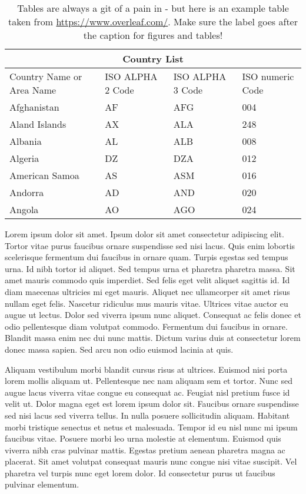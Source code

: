 \begin{table}
	\begin{center}
\begin{tabular}{ |p{3cm}||p{3cm}|p{3cm}|p{3cm}|  }
	\hline
	\multicolumn{4}{|c|}{Country List} \\
	\hline
	Country Name     or Area Name& ISO ALPHA 2 Code &ISO ALPHA 3 Code&ISO numeric Code\\
	\hline
	Afghanistan   & AF    &AFG&   004\\
	Aland Islands&   AX  & ALA   &248\\
	Albania &AL & ALB&  008\\
	Algeria    &DZ & DZA&  012\\
	American Samoa&   AS  & ASM&016\\
	Andorra& AD  & AND   &020\\
	Angola& AO  & AGO&024\\
	\hline
\end{tabular}
\caption{Tables are always a git of a pain in \LaTeXe - but here is an example table taken from \url{https://www.overleaf.com/}. Make sure the label goes after the caption for figures and tables!}
\label{tab:table_ex}
\end{center}	
\end{table}

Lorem ipsum dolor sit amet. Ipsum dolor sit amet consectetur adipiscing elit. Tortor vitae purus faucibus ornare suspendisse sed nisi lacus. Quis enim lobortis scelerisque fermentum dui faucibus in ornare quam. Turpis egestas sed tempus urna. Id nibh tortor id aliquet. Sed tempus urna et pharetra pharetra massa. Sit amet mauris commodo quis imperdiet. Sed felis eget velit aliquet sagittis id. Id diam maecenas ultricies mi eget mauris. Aliquet nec ullamcorper sit amet risus nullam eget felis. Nascetur ridiculus mus mauris vitae. Ultrices vitae auctor eu augue ut lectus. Dolor sed viverra ipsum nunc aliquet. Consequat ac felis donec et odio pellentesque diam volutpat commodo. Fermentum dui faucibus in ornare. Blandit massa enim nec dui nunc mattis. Dictum varius duis at consectetur lorem donec massa sapien. Sed arcu non odio euismod lacinia at quis.

Aliquam vestibulum morbi blandit cursus risus at ultrices. Euismod nisi porta lorem mollis aliquam ut. Pellentesque nec nam aliquam sem et tortor. Nunc sed augue lacus viverra vitae congue eu consequat ac. Feugiat nisl pretium fusce id velit ut. Dolor magna eget est lorem ipsum dolor sit. Faucibus ornare suspendisse sed nisi lacus sed viverra tellus. In nulla posuere sollicitudin aliquam. Habitant morbi tristique senectus et netus et malesuada. Tempor id eu nisl nunc mi ipsum faucibus vitae. Posuere morbi leo urna molestie at elementum. Euismod quis viverra nibh cras pulvinar mattis. Egestas pretium aenean pharetra magna ac placerat. Sit amet volutpat consequat mauris nunc congue nisi vitae suscipit. Vel pharetra vel turpis nunc eget lorem dolor. Id consectetur purus ut faucibus pulvinar elementum.

